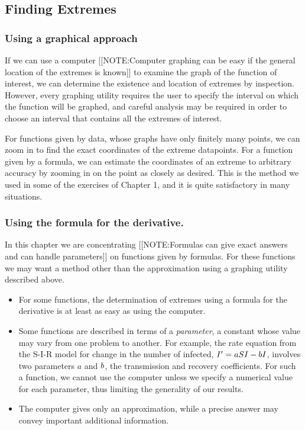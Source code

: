 \subsection{Finding Extremes}
\label{subsec:finding-extremes}

\subsubsection{Using a graphical approach}
\label{subsubsec:using-a-graphical-approach}

	If we can use a computer 
	[[NOTE:Computer graphing can be easy if the general location of the extremes is known]]
to examine the graph of the function of interest, we can determine the existence and location of extremes by inspection.  However, every graphing utility requires the user to specify the interval on which the function will be graphed, and careful analysis may be required in order to choose an interval that contains all the extremes of interest.

For functions given by data, whose graphs have only finitely many points, we can zoom in to find the exact coordinates of the extreme datapoints.  For a function given by a formula, we can estimate the coordinates of an extreme to arbitrary accuracy by zooming in on the point as closely as desired.  This is the method we used in some of the exercises of Chapter 1, and it is quite satisfactory in many situations.  

\subsubsection{Using the formula for the derivative.}
\label{subsubsec:using-the-formula-for-the-derivative}

\enlargethispage*{20pt}
	In this chapter we are concentrating 
	[[NOTE:Formulas can give exact answers and can handle parameters]]
on functions given by formulas.  For these functions we may want a method other than the approximation using a graphing utility described above. 
	\begin{itemize}
\item For some functions, the determination of extremes using a formula for the derivative is at least as easy as using the computer.
\item  Some functions are described in terms of a {\em parameter\/}, a constant whose value may vary from one problem to another.  For example, the rate equation from the S-I-R model for change in the number of infected, $I' = aSI-bI\/$, involves two parameters $a$ and $b\/$, the transmission and recovery coefficients.  For such a function, we cannot use the computer unless we specify a numerical value for each parameter, thus limiting the generality of our results.
\item  The computer gives only an approximation, while a precise answer may convey important additional information.
\end{itemize}

